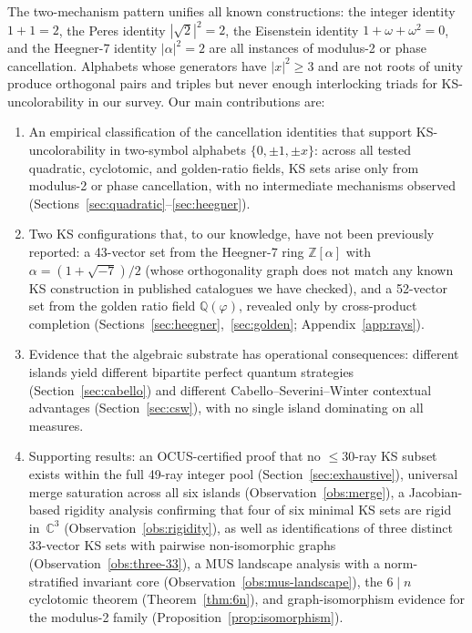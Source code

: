 \documentclass[12pt,a4paper]{article}
\newcommand{\C}{\mathbb{C}}
\newcommand{\Z}{\mathbb{Z}}
\newcommand{\Q}{\mathbb{Q}}
\begin{document}
The two-mechanism pattern unifies all known constructions: the integer identity $1 + 1 = 2$, the Peres identity $|\sqrt{2}|^2 = 2$, the Eisenstein identity $1 + \omega + \omega^2 = 0$, and the Heegner-7 identity $|\alpha|^2 = 2$ are all instances of modulus-2 or phase cancellation.  Alphabets whose generators have $|x|^2 \geq 3$ and are not roots of unity produce orthogonal pairs and triples but never enough interlocking triads for KS-uncolorability in our survey.  Our main contributions are:

\begin{enumerate}[label=(\roman*)]
    \item An empirical classification of the cancellation identities that support KS-un\-color\-ability in two-symbol alphabets $\{0, \pm 1, \pm x\}$: across all tested quadratic, cyclotomic, and golden-ratio fields, KS sets arise only from modulus-2 or phase cancellation, with no intermediate mechanisms observed (Sections~\ref{sec:quadratic}--\ref{sec:heegner}).
    \item Two KS configurations that, to our knowledge, have not been previously reported: a 43-vector set from the Heegner-7 ring $\Z[\alpha]$ with $\alpha = (1{+}\sqrt{-7})/2$ (whose orthogonality graph does not match any known KS construction in published catalogues we have checked), and a 52-vector set from the golden ratio field $\Q(\varphi)$, revealed only by cross-product completion (Sections~\ref{sec:heegner},~\ref{sec:golden}; Appendix~\ref{app:rays}).
    \item Evidence that the algebraic substrate has operational consequences: different islands yield different bipartite perfect quantum strategies (Section~\ref{sec:cabello}) and different Cabello--Severini--Winter contextual advantages (Section~\ref{sec:csw}), with no single island dominating on all measures.
    \item Supporting results: an OCUS-certified proof that no $\leq 30$-ray KS subset exists within the full 49-ray integer pool (Section~\ref{sec:exhaustive}), universal merge saturation across all six islands (Observation~\ref{obs:merge}), a Jacobian-based rigidity analysis confirming that four of six minimal KS sets are rigid in~$\C^3$ (Observation~\ref{obs:rigidity}), as well as identifications of three distinct 33-vector KS sets with pairwise non-isomorphic graphs (Observation~\ref{obs:three-33}), a MUS landscape analysis with a norm-stratified invariant core (Observation~\ref{obs:mus-landscape}), the $6 \mid n$ cyclotomic theorem (Theorem~\ref{thm:6n}), and graph-isomorphism evidence for the modulus-2 family (Proposition~\ref{prop:isomorphism}).
\end{enumerate}
\end{document}
